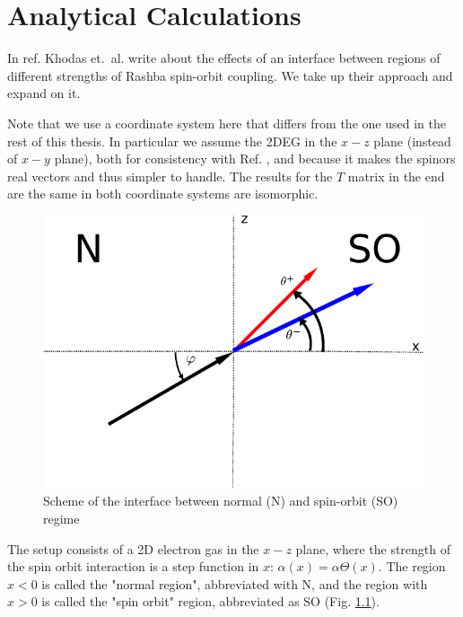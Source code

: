 \chapter{Analytical Calculations}
\label{sec:analytical}
\newcommand{\ta}{\ensuremath{\tilde \alpha}}
In ref. \cite{khodas} Khodas et.~al. write about the effects of an
interface between regions of different strengths of Rashba spin-orbit
coupling. We take up their approach and expand on it.

Note that
we use a coordinate system here that differs from the one used in the
rest of this thesis. In particular we assume the 2DEG in the $x-z$
plane (instead of $x-y$ plane), both for consistency with
Ref. \cite{khodas}, and because it makes the spinors real vectors and
thus simpler to handle. The results for the $T$ matrix in the end are
the same in both coordinate systems are isomorphic.

\begin{figure}
    \begin{center}
        \includegraphics{setup-simple.pdf}
    \end{center}
    \caption{Scheme of the interface between normal (N)
            and spin-orbit (SO) regime}
    \label{fig:setup-zero}
\end{figure}

The setup consists of a 2D electron gas in the $x-z$ plane, where the
strength of the spin orbit interaction is a step function in $x$:
$\alpha(x) = \alpha \Theta(x)$. The region $x < 0$ is called the
"normal region", abbreviated with N, and the region with $x > 0$ is
called the "spin orbit" region, abbreviated as SO (Fig.
\ref{fig:setup-zero}).


